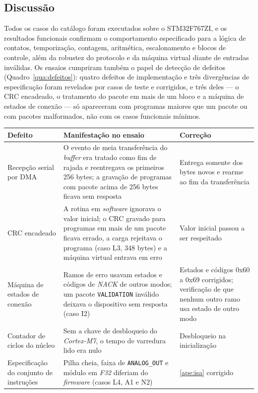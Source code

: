 \subsection{Discussão}
\label{sub:discussao-resultados}

Todos os casos do catálogo foram executados sobre o STM32F767ZI, e os resultados funcionais confirmam o comportamento especificado para a lógica de contatos, temporização, contagem, aritmética, escalonamento e blocos de controle, além da robustez do protocolo e da máquina virtual diante de entradas inválidas.
Os ensaios cumpriram também o papel de detecção de defeitos (Quadro~\ref{qua:defeitos}): quatro defeitos de implementação e três divergências de especificação foram revelados por casos de teste e corrigidos, e três deles --- o CRC encadeado, o tratamento do pacote em mais de um bloco e a máquina de estados de conexão --- só apareceram com programas maiores que um pacote ou com pacotes malformados, não com os casos funcionais mínimos.

\begin{quadrofixo}
    \centering
    \small
    \begin{tabular}{|p{3.6cm}|p{5.4cm}|p{5.2cm}|}
        \hline
        Defeito & Manifestação no ensaio & Correção \\
        \hline
        Recepção serial por DMA & O evento de meia transferência do \textit{buffer} era tratado como fim de rajada e reentregava os primeiros 256 bytes; a gravação de programas com pacote acima de 256 bytes ficava sem resposta & Entrega somente dos bytes novos e rearme ao fim da transferência \\
        \hline
        CRC encadeado & A rotina em \textit{software} ignorava o valor inicial; o CRC gravado para programas em mais de um pacote ficava errado, a carga rejeitava o programa (caso L3, 348 bytes) e a máquina virtual entrava em erro & Valor inicial passou a ser respeitado \\
        \hline
        Máquina de estados de conexão & Ramos de erro usavam estados e códigos de \textit{NACK} de outros modos; um pacote \texttt{VALIDATION} inválido deixava o dispositivo sem resposta (caso I2) & Estados e códigos 0x60 a 0x69 corrigidos; verificação de que nenhum outro ramo usa estado de outro modo \\
        \hline
        Contador de ciclos do núcleo & Sem a chave de desbloqueio do \textit{Cortex-M7}, o tempo de varredura lido era nulo & Desbloqueio na inicialização \\
        \hline
        Especificação do conjunto de instruções & Pilha cheia, faixa de \texttt{ANALOG\_OUT} e módulo em \textit{F32} diferiam do \textit{firmware} (casos L4, A1 e N2) & \ref{ape:isa} corrigido \\
        \hline
    \end{tabular}

    \label{qua:defeitos}
\end{quadrofixo}

